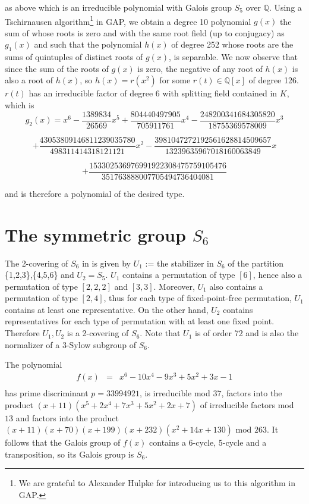 \documentclass[reqno,12pt]{amsart}
\theoremstyle{remark}
\theoremstyle{definition}
\theoremstyle{citing}
\numberwithin{theorem}{section}
\numberwithin{equation}{section}
\begin{document}
as above which is an irreducible polynomial with Galois group $S_{5}$ over ${{\mathbb{{Q}}}}$.
Using a Tschirnausen algorithm\footnote{We are grateful to Alexander Hulpke for introducing us to this algorithm in GAP.} in GAP, we obtain a degree 10 polynomial $g(x)$ the sum of whose roots is zero and with the same root field (up to conjugacy) as $g_1(x)$ and such that
the polynomial $h(x)$ of degree 252 whose roots are the sums of quintuples of distinct roots of $g(x)$, is separable.  We now observe that since the sum of the roots of $g(x)$ is zero, the negative of any root of $h(x)$ is also a root of $h(x)$, so $h(x)=r(x^2)$ for some $r(t)\in{{\mathbb{{Q}}}}[x]$ of degree 126.  $r(t)$ has an irreducible factor of degree
6 with splitting field contained in $K$, which is
$$g_{2}(x) =  x^{6}-\frac{1389834}{26569}x^{5}+\frac{804440497905}{705911761}x^{4}
  -\frac{248200341684305820}{18755369578009}x^{3} $$

   $$ +\frac{43053809146811239035780}{498311414318121121}x^{2}
  -\frac{3981047272192561628814509657}{13239635967018160063849}x$$

$$  +\frac{153302536976991922308475759105476}{351763888007705494736404081}$$

and is therefore a polynomial of the desired type.

\section{The symmetric group $S_{6}$}

The 2-covering of $S_{6}$ in \cite{BBH} is given
by $U_{1}$ := the stabilizer in $S_{6}$ of the
partition \{1,2,3\},\{4,5,6\} and $U_{2}=S_{5}$.   $U_{1}$ contains
a permutation of type $[6]$, hence also a permutation of type $[2,2,2]$
and $[3,3]$. Moreover, $U_{1}$ also contains a permutation of type
$[2,4]$, thus for each type of fixed-point-free permutation, $U_{1}$
contains at least one representative. On the other hand, $U_{2}$
contains representatives for each type of permutation with at least
one fixed point. Therefore $U_1,U_2$ is a 2-covering of $S_6$.  Note that $U_1$ is of order 72 and is also the normalizer of a 3-Sylow
subgroup of $S_6$.

 The polynomial
\begin{eqnarray*}
f(x) & = & x^{6}-10x^{4}-9x^{3}+5x^{2}+3x-1\\
\end{eqnarray*}
has prime discriminant $p=33994921$,
 is irreducible mod
$37$, factors into the product $(x+11)(x^{5}+2x^{4}+7x^{3}+5x^{2}+2x+7)$
of irreducible factors mod $13$ and factors into the product $(x+11)(x+70)(x+199)(x+232)(x^{2}+14x+130)$
mod $263$. It follows that the Galois group of $f(x)$
contains a 6-cycle, 5-cycle and a transposition, so its
Galois group   is
$S_{6}$.
\end{document}

